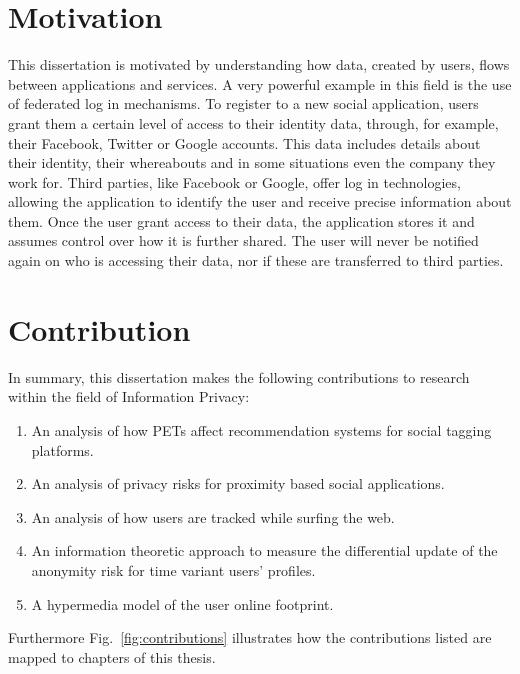 \section{Motivation}

This dissertation is motivated by understanding how data, created by users, flows between applications and services. A very powerful example in this field is the use of federated log in mechanisms. To register to a new social application, users grant them a certain level of access to their identity data, through, for example, their Facebook, Twitter or Google accounts. This data includes details about their identity, their whereabouts and in some situations even the company they work for. Third parties, like Facebook or Google, offer log in technologies, allowing the application to identify the user and receive precise information about them. Once the user grant access to their data, the application stores it and assumes control over how it is further shared. The user will never be notified again on who is accessing their data, nor if these are transferred to third parties. 

\section{Contribution}

In summary, this dissertation makes the following contributions to research within the field of Information Privacy:

\begin{enumerate}
    \item An analysis of how PETs affect recommendation systems for social tagging platforms.
    \item An analysis of privacy risks for proximity based social applications.
    \item An analysis of how users are tracked while surfing the web.
    \item An information theoretic approach to measure the differential update of the anonymity risk for time variant users' profiles.
    \item A hypermedia model of the user online footprint.
\end{enumerate}

Furthermore Fig.~\ref{fig:contributions} illustrates how the contributions listed are mapped to chapters of this thesis.

